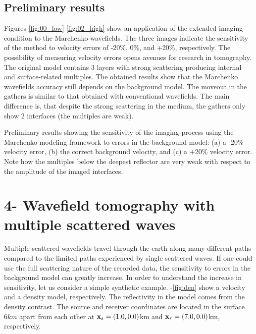 \subsection{Preliminary results}

Figures \ref{fig:00_low}-\ref{fig:02_high} show an application of the extended imaging
condition to the Marchenko wavefields. The three images indicate the sensitivity of the 
method to velocity errors of -20\%, 0\%, and +20\%, respectively. 
 The possibility of measuring velocity errors opens avenues for research 
in tomography. The original model contains 3 layers with strong scattering producing 
internal and surface-related multiples. The obtained results show 
that the Marchenko wavefields accuracy still depends on the background 
model. The moveout in the gathers is similar to that obtained with conventional
wavefields. The main difference is, that despite the strong scattering 
in the medium, the gathers only show 2 interfaces (the multiples are weak). 






%
{Preliminary results showing the sensitivity of the imaging process using the Marchenko modeling 
framework to errors in the background model: (a) a -20\% velocity error, (b) the correct 
background velocity, and (c) a +20\% velocity error. Note how the multiples below the deepest
reflector are very weak with respect to the amplitude of the imaged interfaces. }

\newpage
\section{4- Wavefield tomography with multiple scattered waves}
 Multiple scattered wavefields travel through the earth
along many different paths compared to the limited paths experienced by 
single scattered waves. If one could use the full scattering 
nature of the recorded data, the sensitivity to errors in the
background model can greatly increase. 
In order to understand the increase in sensitivity, let us
consider a simple synthetic example. 
-\ref{fig:den} show a velocity and a density model, respectively.
 The reflectivity in the model comes from the density contrast. The source 
and receiver coordinates are located in the surface $6km$ apart from each 
other at ${\bf x}_s=(1.0,0.0)$km and ${\bf x}_r=(7.0,0.0)$km, respectively. 

